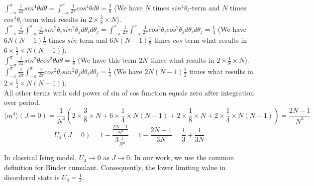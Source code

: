 $ \int_{-\pi}^{\pi}  \frac{1}{2 \pi} sin^4 \theta d \theta =\int_{-\pi}^{\pi}  \frac{1}{2 \pi} cos^4 \theta d \theta = \frac{3}{8}$ (We  have $N$ times $sin^4\theta_i$-term and $N$ times $cos^4\theta_i$-term  what results in $2\times \frac{3}{8} \times N$). \\

$ \int_{-\pi}^{\pi}  \frac{1}{2 \pi}\int_{-\pi}^{\pi} \frac{1}{2 \pi} sin^2 \theta_i sin^2 \theta_j d\theta_i  d\theta_j = \int_{-\pi}^{\pi}  \frac{1}{2 \pi}\int_{-\pi}^{\pi} \frac{1}{2 \pi} cos^2 \theta_i cos^2 \theta_j d\theta_i  d\theta_j = \frac{1}{4}$ (We  have $6N(N-1)\frac{1}{2}$ times $sin$-term and $6N(N-1)\frac{1}{2}$ times $cos$-term  what results in $6\times \frac{1}{4} \times N(N-1)$). \\

$ \int_{-\pi}^{\pi}  \frac{1}{2 \pi} sin^2 \theta cos^2 \theta d \theta  = \frac{1}{8}$ (We  have this term $2N$ times  what results in $2\times \frac{1}{8} \times N$). \\

$ \int_{-\pi}^{\pi}  \frac{1}{2 \pi}\int_{-\pi}^{\pi} \frac{1}{2 \pi} cos^2 \theta_i sin^2 \theta_j d\theta_i  d\theta_j = \frac{1}{4}$ (We  have $2N(N-1)\frac{1}{2}$ times  what results in $2\times \frac{1}{4} \times N(N-1)$). \\

All other terms with odd power of sin of cos function equals zero after integration over period. 
\begin{equation*}
\langle m^4 \rangle (J=0) = \frac{1}{N^4} \left( 2\times \frac{3}{8} \times N + 6\times \frac{1}{4} \times N(N-1) + 2\times \frac{1}{8} \times N + 2\times \frac{1}{4} \times N(N-1)
\right) = \frac{2N-1}{N^3}  
\end{equation*}
\begin{equation}
\label{binderqum_0}
U_4 (J=0) = 1 - \frac{  \frac{2N-1}{N^3} }{3  \frac{1}{N^2} } = 1 - 
\frac{2N-1}{3N} = \frac{1}{3} + \frac{1}{3N} 
\end{equation}
 
 In classical Ising model, $U_4 \rightarrow 0$ as $J \rightarrow 0$. In our work, we use the common definition for Binder cumulant. Consequently, the lower limiting value in disordered state is $U_4 = \frac{1}{3}$.
 
